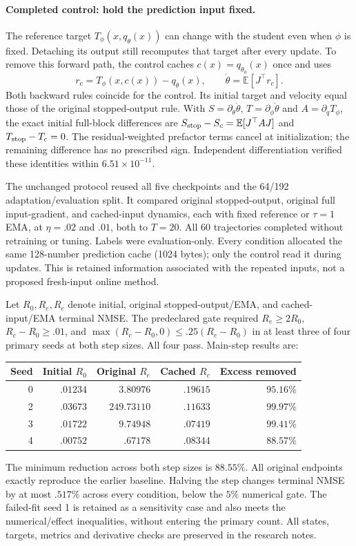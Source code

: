 \documentclass[11pt,a4paper]{article}
\newcommand{\E}{\mathbb{E}}
\begin{document}
\paragraph{Completed control: hold the prediction input fixed.}
The reference target $T_\phi(x,q_\theta(x))$ can change with the student
even when $\phi$ is fixed. Detaching its output still recomputes that
target after every update. To remove this forward path, the control
caches $c(x)=q_{\theta_0}(x)$ once and uses
\[
 r_c=T_\phi(x,c(x))-q_\theta(x),\qquad
 \dot\theta=\E[J^\top r_c].
\]
Both backward rules coincide for the control. Its initial target and
velocity equal those of the original stopped-output rule. With
$S=\partial_\theta\dot\theta$, $T=\partial_\phi\dot\theta$ and
$A=\partial_qT_\phi$, the exact initial full-block differences are
$S_{\rm stop}-S_c=\E[J^\top A J]$ and $T_{\rm stop}-T_c=0$.
The residual-weighted prefactor terms cancel at initialization; the
remaining difference has no prescribed sign. Independent differentiation
verified these identities within $6.51\times10^{-11}$.

The unchanged protocol reused all five checkpoints and the 64/192
adaptation/evaluation split. It compared original stopped-output,
original full input-gradient, and cached-input dynamics, each with fixed
reference or $\tau=1$ EMA, at $\eta=.02$ and $.01$, both to $T=20$.
All 60 trajectories completed without retraining or tuning. Labels were
evaluation-only. Every condition allocated the same 128-number prediction
cache (1024 bytes); only the control read it during updates. This is
retained information associated with the repeated inputs, not a proposed
fresh-input online method.

Let $R_0,R_e,R_c$ denote initial, original stopped-output/EMA, and
cached-input/EMA terminal NMSE. The predeclared gate required
$R_e\ge2R_0$, $R_e-R_0\ge.01$, and
$\max(R_c-R_0,0)\le.25(R_e-R_0)$ in at least three of four primary seeds
at both step sizes. All four pass. Main-step results are:
\begin{center}
\begin{tabular}{rrrrr}
Seed & Initial $R_0$ & Original $R_e$ & Cached $R_c$ & Excess removed\\ \hline
0 & $.01234$ & $3.80976$ & $.19615$ & $95.16\%$\\
2 & $.03673$ & $249.73110$ & $.11633$ & $99.97\%$\\
3 & $.01722$ & $9.74948$ & $.07419$ & $99.41\%$\\
4 & $.00752$ & $.67178$ & $.08344$ & $88.57\%$
\end{tabular}
\end{center}
The minimum reduction across both step sizes is $88.55\%$. All original
endpoints exactly reproduce the earlier baseline. Halving the step changes
terminal NMSE by at most $.517\%$ across every condition, below the $5\%$
numerical gate. The failed-fit seed 1 is retained as a sensitivity case
and also meets the numerical/effect inequalities, without entering the
primary count. All states, targets, metrics and derivative checks are
preserved in the research notes.
\end{document}
